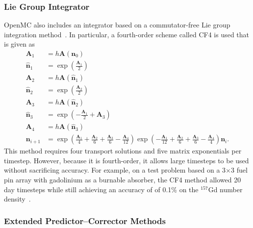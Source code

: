 \documentclass[3p,authoryear]{elsarticle}
\newcommand{\vect}[1]{\mathbf{#1}} %
\begin{document}
\subsubsection{Lie Group Integrator}

OpenMC also includes an integrator based on a commutator-free Lie group
integration method~\citep{celledoni2004fgcs}. In particular, a fourth-order
scheme called CF4 is used that is given as
\begin{equation}
  \begin{split}
    \vect{A}_1 &= h\vect{A}(\vect{n}_0) \\
    \hat{\vect{n}}_1 &= \exp \left ( \frac{\vect{A}_1}{2} \right ) \\
    \vect{A}_2 &= h\vect{A}(\hat{\vect{n}}_1) \\
    \hat{\vect{n}}_2 &= \exp \left ( \frac{\vect{A}_2}{2} \right ) \\
    \vect{A}_3 &= h \vect{A}(\hat{\vect{n}}_2) \\
    \hat{\vect{n}}_3 &= \exp \left ( -\frac{\vect{A}_1}{2}  + \vect{A}_3 \right ) \\
    \vect{A}_4 &= h\vect{A}(\hat{\vect{n}}_3) \\
    \vect{n}_{i+1} &= \exp \left ( \frac{\vect{A}_1}{4} + \frac{\vect{A}_2}{6} + \frac{\vect{A}_3}{6} - \frac{\vect{A}_4}{12} \right )
    \exp \left ( -\frac{\vect{A}_1}{12} + \frac{\vect{A}_2}{6} + \frac{\vect{A}_3}{6} - \frac{\vect{A}_4}{4} \right ) \vect{n}_i.
  \end{split}
\end{equation}
This method requires four transport solutions and five matrix exponentials per
timestep. However, because it is fourth-order, it allows large timesteps to be
used without sacrificing accuracy. For example, on a test problem based on a
3$\times$3 fuel pin array with gadolinium as a burnable absorber, the CF4 method
allowed 20 day timesteps while still achieving an accuracy of of 0.1\% on the
$^{157}$Gd number density~\citep{josey2017phd}.

\subsubsection{Extended Predictor--Corrector Methods}
\end{document}
